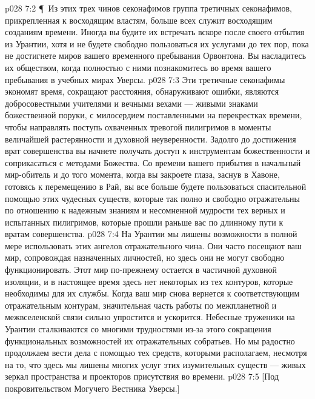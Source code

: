 \vs p028 7:2 \P\ Из этих трех чинов секонафимов группа третичных секонафимов, прикрепленная к восходящим властям, больше всех служит восходящим созданиям времени. Иногда вы будите их встречать вскоре после своего отбытия из Урантии, хотя и не будете свободно пользоваться их услугами до тех пор, пока не достигнете миров вашего временного пребывания Орвонтона. Вы насладитесь их обществом, когда полностью с ними познакомитесь во время вашего пребывания в учебных мирах Уверсы.
\vs p028 7:3 Эти третичные секонафимы экономят время, сокращают расстояния, обнаруживают ошибки, являются добросовестными учителями и вечными вехами --- живыми знаками божественной поруки, с милосердием поставленными на перекрестках времени, чтобы направлять поступь охваченных тревогой пилигримов в моменты величайшей растерянности и духовной неуверенности. Задолго до достижения врат совершенства вы начнете получать доступ к инструментам божественности и соприкасаться с методами Божества. Со времени вашего прибытия в начальный мир\hyp{}обитель и до того момента, когда вы закроете глаза, заснув в Хавоне, готовясь к перемещению в Рай, вы все больше будете пользоваться спасительной помощью этих чудесных существ, которые так полно и свободно отражательны по отношению к надежным знаниям и несомненной мудрости тех верных и испытанных пилигримов, которые прошли раньше вас по длинному пути к вратам совершенства.
\vs p028 7:4 На Урантии мы лишены возможности в полной мере использовать этих ангелов отражательного чина. Они часто посещают ваш мир, сопровождая назначенных личностей, но здесь они не могут свободно функционировать. Этот мир по\hyp{}прежнему остается в частичной духовной изоляции, и в настоящее время здесь нет некоторых из тех контуров, которые необходимы для их службы. Когда ваш мир снова вернется к соответствующим отражательным контурам, значительная часть работы по межпланетной и межвселенской связи сильно упростится и ускорится. Небесные труженики на Урантии сталкиваются со многими трудностями из\hyp{}за этого сокращения функциональных возможностей их отражательных собратьев. Но мы радостно продолжаем вести дела с помощью тех средств, которыми располагаем, несмотря на то, что здесь мы лишены многих услуг этих изумительных существ --- живых зеркал пространства и проекторов присутствия во времени.
\vs p028 7:5 [Под покровительством Могучего Вестника Уверсы.]

